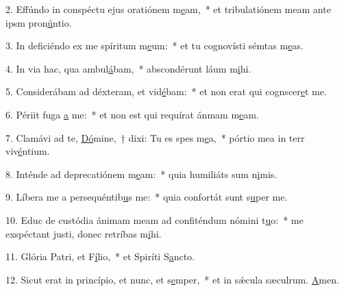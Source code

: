 2. Effúndo in conspéctu ejus oratiónem m\uline{e}am,~* et tribulatiónem meam ante ipsm pron\uline{ú}ntio.\par 
3. In deficiéndo ex me spíritum m\uline{e}um:~* et tu cognovísti sémtas m\uline{e}as.\par 
4. In via hac, qua ambul\uline{á}bam,~* abscondérunt láum m\uline{i}hi.\par 
5. Considerábam ad déxteram, et vid\uline{é}bam:~* et non erat qui cognscer\uline{e}t me.\par 
6. Périit fuga \uline{a} me:~* et non est qui requírat ánmam m\uline{e}am.\par 
7. Clamávi ad te, \uline{Dó}mine,~† dixi: Tu es spes m\uline{e}a,~* pórtio mea in terr viv\uline{é}ntium.\par 
8. Inténde ad deprecatiónem m\uline{e}am:~* quia humiliáts sum n\uline{i}mis.\par 
9. Líbera me a persequéntib\uline{u}s me:~* quia confortát sunt s\uline{u}per me.\par 
10. Educ de custódia ánimam meam ad confiténdum nómini t\uline{u}o:~* me exspéctant justi, donec retríbas m\uline{i}hi.\par 
11. Glória Patri, et F\uline{í}lio,~* et Spiríti S\uline{a}ncto.\par 
12. Sicut erat in princípio, et nunc, et s\uline{e}mper,~* et in sǽcula sæculrum. \uline{A}men.\par 
